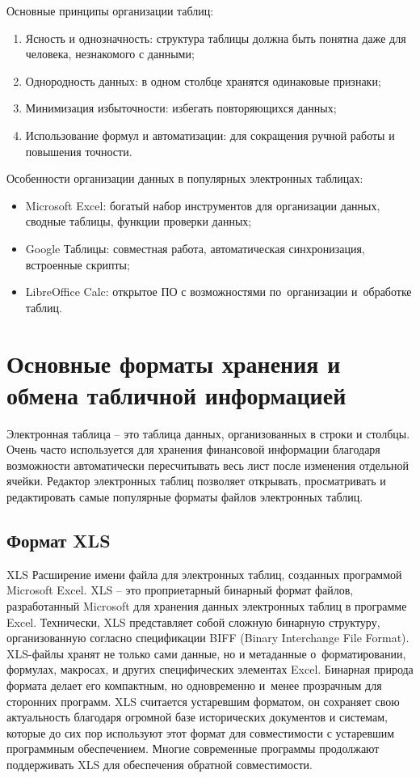 \documentclass{ou}
\begin{document}
Основные принципы организации таблиц:
\begin{enumerate}[leftmargin=0em, itemindent=3.75em, nosep, label=\arabic*)]
\item Ясность и однозначность: структура таблицы должна быть понятна даже для человека, незнакомого с данными;
\item Однородность данных: в одном столбце хранятся одинаковые признаки;
\item Минимизация избыточности: избегать повторяющихся данных;
\item Использование формул и автоматизации: для сокращения ручной работы и повышения точности.
\end{enumerate}

Особенности организации данных в популярных электронных таблицах:
\begin{itemize}[label=-, leftmargin=0em, itemindent=3.35em, nosep]
\item Microsoft Excel: богатый набор инструментов для организации данных, сводные таблицы, функции проверки данных;
\item Google Таблицы: совместная работа, автоматическая синхронизация, встроенные скрипты;
\item LibreOffice Calc: открытое ПО с возможностями по~организации и~обработке таблиц.
\end{itemize}
\newpage
\section{Основные форматы хранения и обмена табличной информацией}
Электронная таблица -- это таблица данных, организованных в строки и столбцы. Очень часто используется для хранения финансовой информации благодаря возможности автоматически пересчитывать весь лист после изменения отдельной ячейки. Редактор электронных таблиц позволяет открывать, просматривать и редактировать самые популярные форматы файлов электронных таблиц. 
\subsection{Формат XLS}
XLS Расширение имени файла для электронных таблиц, созданных программой Microsoft Excel. XLS -- это проприетарный бинарный формат файлов, разработанный Microsoft для хранения данных электронных таблиц в программе Excel. Технически, XLS представляет собой сложную бинарную структуру, организованную согласно спецификации BIFF (Binary Interchange File Format). XLS-файлы хранят не только сами данные, но и метаданные о~форматировании, формулах, макросах, и других специфических элементах Excel. Бинарная природа формата делает его компактным, но одновременно и~менее прозрачным для сторонних программ. XLS считается устаревшим форматом, он сохраняет свою актуальность благодаря огромной базе исторических документов и системам, которые до сих пор используют этот формат для совместимости с устаревшим программным обеспечением. Многие современные программы продолжают поддерживать XLS для обеспечения обратной совместимости.
\end{document}

